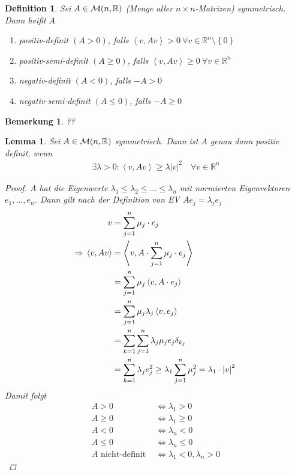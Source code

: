 \documentclass[11pt, twoside, a4paper]{article}
\theoremstyle{plain}
\newtheorem{bemerkung}[blockelement]{Bemerkung}
\newtheorem{definition}[blockelement]{Definition}
\newtheorem{lemma}[blockelement]{Lemma}
\numberwithin{equation}{subsection}
\newcommand{\set}[1]{\left\{#1\right\}}
\newcommand{\pair}[1]{\left(#1\right)}
\newcommand{\of}[1]{\mathopen{}\mathclose{}\bgroup\left(#1\aftergroup\egroup\right)}
\newcommand{\abs}[1]{\left\lvert#1\right\rvert}
\newcommand{\sprod}[1]{\left<#1\right>}
\newcommand{\equivalent}[0]{\Leftrightarrow{}}
\newcommand{\impl}[0]{\Rightarrow{}}
\newcommand{\exclude}[0]{\setminus}
\newcommand{\R}{\mathbb{R}}
\newcommand{\mM}{\mathcal{M}}
\begin{document}
    \begin{definition}
        Sei $A\in\mM\of{n, \R}$ (Menge aller $n\times n$-Matrizen) symmetrisch. Dann heißt $A$
        \begin{enumerate}[label=(\roman*)]
            \item positiv-definit $\pair{A > 0}$, falls $\sprod{v, Av} > 0~\forall v\in\R^n\exclude\set{0}$
            \item positiv-semi-definit $\pair{A \geq 0}$, falls $\sprod{v, Av} \geq 0~\forall v\in\R^n$
            \item negativ-definit $\pair{A < 0}$, falls $-A > 0$
            \item negativ-semi-definit $\pair{A \leq 0}$, falls $-A \geq 0$
        \end{enumerate}
    \end{definition}

    \begin{bemerkung}
        ??
    \end{bemerkung}

    \begin{lemma}
        Sei $A\in\mM\of{n, \R}$ symmetrisch. Dann ist $A$ genau dann positiv definit, wenn
        \begin{align*}
            \exists \lambda > 0\colon \sprod{v, A v}\geq \lambda \abs{v}^2\quad\forall v\in\R^n
        \end{align*}

        \begin{proof}
            $A$ hat die Eigenwerte $\lambda_1 \leq \lambda_2 \leq \dots \leq \lambda_n$ mit normierten Eigenvektoren $e_1, \ldots, e_n$. Dann gilt nach der Definition von EV $A e_j = \lambda _j e_j$
            \begin{align*}
                v &= \sum_{j=1}^{n} \mu_j \cdot e_j\\
                \impl \sprod{v, Av} &= \sprod{v, A\cdot \sum_{j=1}^{n} \mu_j\cdot e_j}\\
                &= \sum_{j=1}^{n} \mu_j \sprod{v, A\cdot e_j}\\
                &= \sum_{j=1}^{n} \mu_j \lambda _j \sprod{v, e_j}\\
                &= \sum_{k=1}^{n} \sum_{j=1}^{n} \lambda_j \mu_j e_j \delta_{k_j}\\
                &= \sum_{k=1}^{n} \lambda _j e_j^2 \geq \lambda_1 \sum_{j=1}^{n} \mu_j^2 = \lambda_1 \cdot\abs{v}^2\qedhere
            \end{align*}
            Damit folgt
            \begin{align*}
                A > 0 &\equivalent \lambda_1 > 0\\
                A \geq 0 &\equivalent \lambda_1 \geq 0\\
                A < 0 &\equivalent \lambda_{n} < 0\\
                A \leq 0 &\equivalent \lambda_n \leq 0\\
                A\text{ nicht-definit } &\equivalent \lambda_1 < 0, \lambda_n > 0
            \end{align*}
        \end{proof}
    \end{lemma}
\end{document}
